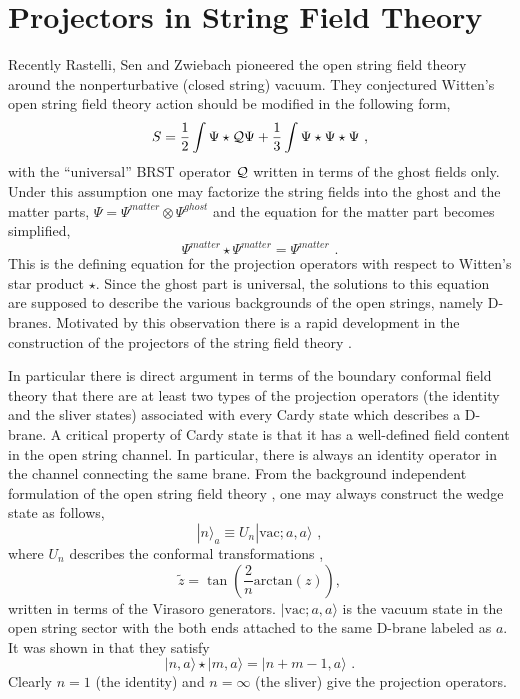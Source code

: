 \documentclass[a4paper,12pt]{article}
\begin{document}
\section{Projectors in String Field Theory}
Recently Rastelli, Sen and 
Zwiebach \cite{r-RSZ1, r-RSZ2}
pioneered the open string field theory 
around the nonperturbative (closed string) vacuum.
They conjectured Witten's open string field 
theory action \cite{r-Witten} should be modified
in the following form,
\begin{equation}\label{e-RSZ}
 S=\frac{1}{2}\int \Psi\star{\cal Q}\Psi +\frac{1}{3}\int 
\Psi\star\Psi\star\Psi\,\,,
\end{equation}
with the ``universal'' BRST operator ${\cal Q}$ written in terms of
the ghost fields only. Under this assumption one may factorize
the string fields into the ghost and the matter parts,
$\Psi=\Psi^{matter}\otimes\Psi^{ghost}$
and the equation for the matter part becomes simplified,
\begin{equation}
 \Psi^{matter}\star \Psi^{matter} = \Psi^{matter}\,\,.
\end{equation}
This is the defining equation for the projection operators
with respect to Witten's star product $\star$.
Since the ghost part is universal, the solutions to
this equation are supposed to describe the various 
backgrounds of the open strings, namely D-branes.
Motivated by this observation there is a rapid development
in the construction of the projectors of the string field theory
\cite{r-RSZ3, r-GT1, r-KO, r-RSZ4, r-David, r-Matsuo1, 
r-GT2, r-RSZ5,r-Matsuo2}.

In particular there is direct argument \cite{r-RSZ4, r-Matsuo1}
in terms of the boundary conformal field theory that 
there are at least two types of the projection operators 
(the identity and the sliver states) associated with
every Cardy state which describes a D-brane. 
A critical property of Cardy state is that it has
a well-defined field content in the open string channel.
In particular, there is always an identity operator in the
channel connecting the same brane.
From the background independent formulation of the
open string field theory \cite{r-RZ}, one may always construct
the wedge state as follows,
\begin{equation}
 |n\rangle_a \equiv U_n|\mbox{vac};a,a\rangle\,\,,
\end{equation}
where $U_n$ describes the conformal transformations 
\cite{r-RZ, r-RSZ4},
\begin{equation}
 \tilde{z}=\tan\left(\frac{2}{n}\mbox{arctan}(z)\right),
\end{equation}
written in terms of the Virasoro generators.
$|\mbox{vac}; a, a\rangle$ is the vacuum state
in the open string sector with the both ends attached
to the same D-brane labeled as $a$. It was shown in \cite{r-RZ}
that they satisfy
\begin{equation}
 |n,a\rangle \star |m, a\rangle = |n+m-1,a\rangle\,\,.
\end{equation}
Clearly $n=1$ (the identity) and
$n=\infty$ (the sliver) give the projection operators.
\end{document}
